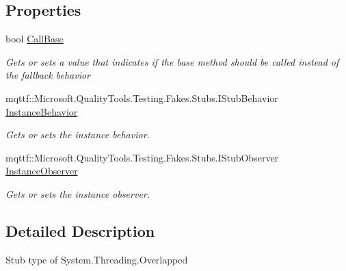 \subsection*{Properties}
\begin{DoxyCompactItemize}
\item 
bool \hyperlink{class_system_1_1_threading_1_1_fakes_1_1_stub_overlapped_a64f4773119cf7c4bf130200f283dec8e}{Call\-Base}
\begin{DoxyCompactList}\small\item\em Gets or sets a value that indicates if the base method should be called instead of the fallback behavior\end{DoxyCompactList}\item 
mqttf\-::\-Microsoft.\-Quality\-Tools.\-Testing.\-Fakes.\-Stubs.\-I\-Stub\-Behavior \hyperlink{class_system_1_1_threading_1_1_fakes_1_1_stub_overlapped_a985c633c9555eaff3c75af85a4563d03}{Instance\-Behavior}
\begin{DoxyCompactList}\small\item\em Gets or sets the instance behavior.\end{DoxyCompactList}\item 
mqttf\-::\-Microsoft.\-Quality\-Tools.\-Testing.\-Fakes.\-Stubs.\-I\-Stub\-Observer \hyperlink{class_system_1_1_threading_1_1_fakes_1_1_stub_overlapped_a05b24c63d6ebd132f53c7b9f5108800f}{Instance\-Observer}
\begin{DoxyCompactList}\small\item\em Gets or sets the instance observer.\end{DoxyCompactList}\end{DoxyCompactItemize}


\subsection{Detailed Description}
Stub type of System.\-Threading.\-Overlapped



